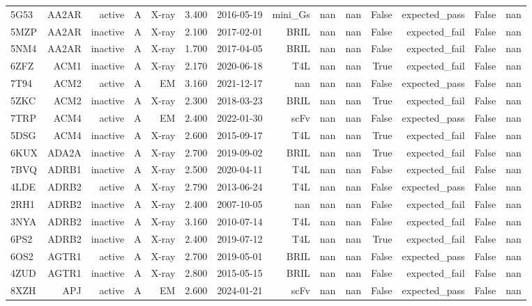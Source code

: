 \begin{longtable}{lrrrrrrrrrrrrr}
5G53 & AA2AR & active & A & X-ray & 3.400 & 2016-05-19 & mini\_Gs & nan & nan & False & expected\_pass & False & nan \\
5MZP & AA2AR & inactive & A & X-ray & 2.100 & 2017-02-01 & BRIL & nan & nan & False & expected\_fail & False & nan \\
5NM4 & AA2AR & inactive & A & X-ray & 1.700 & 2017-04-05 & BRIL & nan & nan & False & expected\_fail & False & nan \\
6ZFZ & ACM1 & inactive & A & X-ray & 2.170 & 2020-06-18 & T4L & nan & nan & True & expected\_fail & False & nan \\
7T94 & ACM2 & active & A & EM & 3.160 & 2021-12-17 & nan & nan & nan & False & expected\_pass & False & nan \\
5ZKC & ACM2 & inactive & A & X-ray & 2.300 & 2018-03-23 & BRIL & nan & nan & True & expected\_fail & False & nan \\
7TRP & ACM4 & active & A & EM & 2.400 & 2022-01-30 & scFv & nan & nan & False & expected\_pass & False & nan \\
5DSG & ACM4 & inactive & A & X-ray & 2.600 & 2015-09-17 & T4L & nan & nan & True & expected\_fail & False & nan \\
6KUX & ADA2A & inactive & A & X-ray & 2.700 & 2019-09-02 & BRIL & nan & nan & True & expected\_fail & False & nan \\
7BVQ & ADRB1 & inactive & A & X-ray & 2.500 & 2020-04-11 & T4L & nan & nan & False & expected\_fail & False & nan \\
4LDE & ADRB2 & active & A & X-ray & 2.790 & 2013-06-24 & T4L & nan & nan & False & expected\_pass & False & nan \\
2RH1 & ADRB2 & inactive & A & X-ray & 2.400 & 2007-10-05 & nan & nan & nan & False & expected\_fail & False & nan \\
3NYA & ADRB2 & inactive & A & X-ray & 3.160 & 2010-07-14 & T4L & nan & nan & False & expected\_fail & False & nan \\
6PS2 & ADRB2 & inactive & A & X-ray & 2.400 & 2019-07-12 & T4L & nan & nan & True & expected\_fail & False & nan \\
6OS2 & AGTR1 & active & A & X-ray & 2.700 & 2019-05-01 & BRIL & nan & nan & False & expected\_pass & False & nan \\
4ZUD & AGTR1 & inactive & A & X-ray & 2.800 & 2015-05-15 & BRIL & nan & nan & False & expected\_fail & False & nan \\
8XZH & APJ & active & A & EM & 2.600 & 2024-01-21 & scFv & nan & nan & False & expected\_pass & False & nan \\

\end{longtable}
